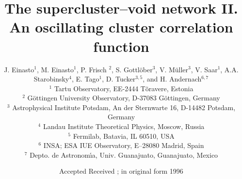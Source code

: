 

\newcommand{\etal}{{\rm et al.~}}
\newcommand{\Mpc}{$h^{-1}$~{\rm Mpc}}


\title[Oscillating correlation function]
      {The supercluster--void network II.\\
      An oscillating cluster correlation function}

\author[J. Einasto et al.]
  { J. Einasto$^1$,  M. Einasto$^1$, P. Frisch $^2$, S.
  Gottl\"ober$^3$, V. M\"uller$^3$, V. Saar$^1$, 
  \newauthor A.A. Starobinsky$^4$, 
  E. Tago$^1$,  D. Tucker$^{3,5}$, and H. Andernach$^{6,7}$ \\
  $^1$ Tartu Observatory, EE-2444 T\~oravere, Estonia \\
  $^2$ G\"ottingen University Observatory, D-37083 G\"ottingen, Germany \\ 
  $^3$ Astrophysical Institute Potsdam, An der Sternwarte 16,
       D-14482 Potsdam, Germany \\
  $^4$ Landau Institute Theoretical Physics, Moscow, Russia \\
  $^5$ Fermilab, Batavia, IL 60510, USA \\
  $^{6}$ INSA; ESA IUE Observatory, E--28080 Madrid, Spain \\
  $^7$ Depto. de Astronom\'\i a, Univ. Guanajuato, Guanajuato, 
       Mexico }

\date{Accepted  Received  ; in original form 1996}



\maketitle

